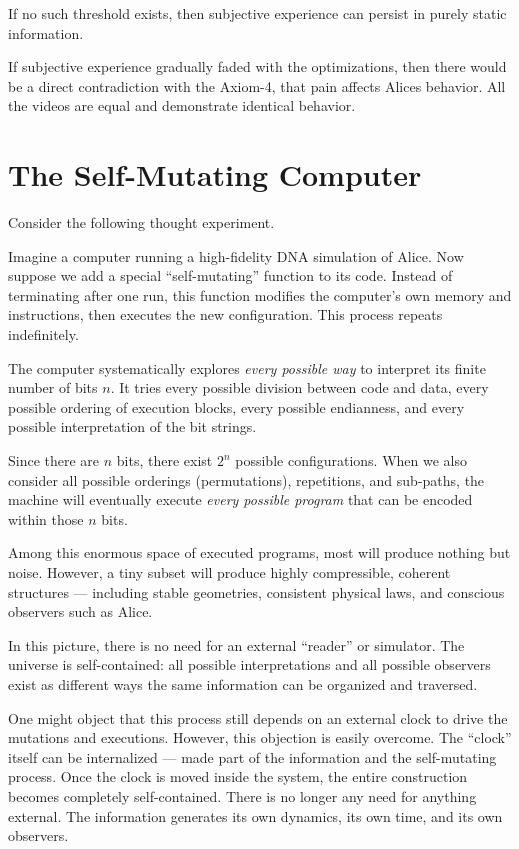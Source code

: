 If no such threshold exists, then subjective experience can persist in purely static information.

If subjective experience gradually faded with the optimizations, then there would be a direct contradiction with the Axiom-4, that pain affects Alices behavior. All the videos are equal and
demonstrate identical behavior.


\section{The Self-Mutating Computer}

Consider the following thought experiment.

Imagine a computer running a high-fidelity DNA simulation of Alice. Now suppose we add a special ``self-mutating'' function to its code.
Instead of terminating after one run, this function modifies the computer's own memory and instructions, then executes the new configuration. This process repeats indefinitely.

The computer systematically explores \emph{every possible way} to interpret its finite number of bits $n$. It tries every possible division between code and data, every possible ordering of execution blocks, every possible endianness, and every possible interpretation of the bit strings. 

Since there are $n$ bits, there exist $2^n$ possible configurations. When we also consider all possible orderings (permutations), repetitions, and sub-paths, the machine will eventually execute \emph{every possible program} that can be encoded within those $n$ bits.

Among this enormous space of executed programs, most will produce nothing but noise. However, a tiny subset will produce highly compressible, coherent structures --- including stable geometries, consistent physical laws, and conscious observers such as Alice.

In this picture, there is no need for an external ``reader'' or simulator. The universe is self-contained: all possible interpretations and all possible observers exist as different ways the same information can be organized and traversed.

One might object that this process still depends on an external clock to drive the mutations and executions. However, this objection is easily overcome. The ``clock'' itself can be internalized --- made part of the information and the self-mutating process. Once the clock is moved inside the system, the entire construction becomes completely self-contained. There is no longer any need for anything external. The information generates its own dynamics, its own time, and its own observers.

